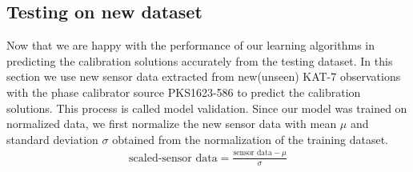 \begin{table}[H]
\label{T:equipos}
\begin{center}
\end{center}
\caption{The table shows the performance of the Extremely randomized tree algorithm in predicting the amplitude and phase gain solutions for both h and v polarizations. The values shown represents the uniform average of all KAT-7 antennas, i.e, all outputs measures are averaged with uniform weight. Majority of the predictions stay near the ideal truth values with rmse \ref{MSE} and rmae \ref{MAE}  $\approx <$ 0.5, $R^2$ \ref{R2score} and explained variance V \ref{ExV} are converging to 1.}
\end{table}

\subsection{Testing on new dataset}

Now that we are happy with the performance of our learning algorithms in predicting the calibration solutions accurately from the testing dataset. In this section we use new sensor data extracted from new(unseen) KAT-7 observations with the phase calibrator source PKS1623-586 to predict the calibration solutions. This process is called model validation. Since our model was trained on normalized data, we first normalize the new sensor data with mean $\mu$ and standard deviation $\sigma$ obtained from the normalization of the training dataset.
\begin{align}
\text{scaled-sensor data}= \frac{\text{sensor data}- \mu}{\sigma}
\end{align}

